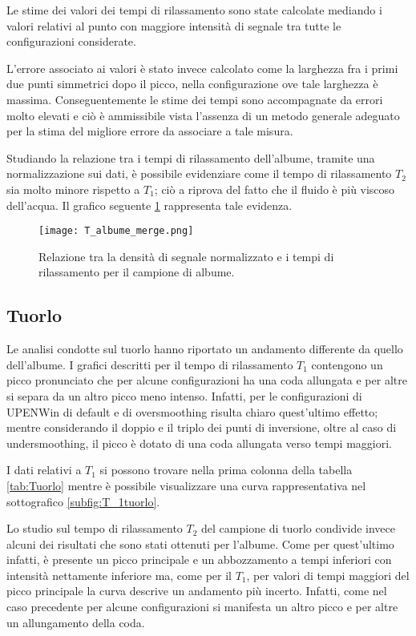 Le stime dei valori dei tempi di rilassamento sono state calcolate mediando i valori relativi al punto con maggiore intensità di segnale tra tutte le configurazioni considerate.

L'errore associato ai valori è stato invece calcolato come la larghezza fra i primi due punti simmetrici dopo il picco, nella configurazione ove tale larghezza è massima.
Conseguentemente le stime dei tempi sono accompagnate da errori molto elevati e ciò è ammissibile vista l'assenza di un metodo generale adeguato per la stima del migliore errore da associare a tale misura.

Studiando la relazione tra i tempi di rilassamento dell'albume, tramite una normalizzazione sui dati, è possibile evidenziare come il tempo di rilassamento $T_2$ sia molto minore rispetto a $T_1$;
ciò a riprova del fatto che il fluido è più viscoso dell'acqua.   
Il grafico seguente \ref{fig:Albume} rappresenta tale evidenza.

\begin{figure}[ht]
\centering
\texttt{[image: T\_albume\_merge.png]}
\caption{Relazione tra la densità di segnale normalizzato e i tempi di rilassamento per il campione di albume.}
\label{fig:Albume}
\end{figure}




\subsection*{Tuorlo}

Le analisi condotte sul tuorlo hanno riportato un andamento differente da quello dell'albume.
I grafici descritti per il tempo di rilassamento $T_1$ contengono un picco pronunciato che per alcune configurazioni ha una coda allungata e per altre si separa da un altro picco meno intenso.
Infatti, per le configurazioni di UPENWin di default e di oversmoothing risulta chiaro quest'ultimo effetto; mentre considerando il doppio e il triplo dei punti di inversione, oltre al caso di undersmoothing, il picco è dotato di una coda allungata verso tempi maggiori.

I dati relativi a $T_1$ si possono trovare nella prima colonna della tabella \ref{tab:Tuorlo} mentre è possibile visualizzare una curva rappresentativa nel sottografico \ref{subfig:T_1tuorlo}. 

Lo studio sul tempo di rilassamento $T_2$ del campione di tuorlo condivide invece alcuni dei risultati che sono stati ottenuti per l'albume. 
Come per quest'ultimo infatti, è presente un picco principale e un abbozzamento a tempi inferiori con intensità nettamente inferiore ma, come per il $T_1$, per valori di tempi maggiori del picco principale la curva descrive un andamento più incerto.
Infatti, come nel caso precedente per alcune configurazioni si manifesta un altro picco e per altre un allungamento della coda.

